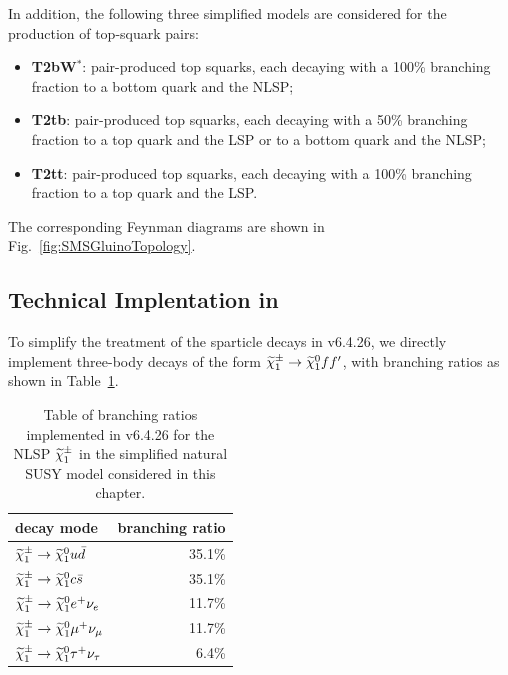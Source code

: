 In addition, the following three simplified models are considered for
the production of top-squark pairs:
\begin{itemize}
\item \textbf{ T2bW$^{\ast}$}: pair-produced top squarks, each decaying
  with a 100\% branching fraction to a bottom quark and the NLSP;
\item \textbf{ T2tb}: pair-produced top squarks, each decaying with a 50\%
  branching fraction to a top quark and the LSP or to a bottom quark and
  the NLSP;
\item \textbf{ T2tt}: pair-produced top squarks, each decaying with a
  100\% branching fraction to a top quark and the LSP.
\end{itemize}
The corresponding Feynman diagrams are shown in
Fig.~\ref{fig:SMSGluinoTopology}.

\subsection{Technical Implentation in \PYTHIA}
To simplify the treatment of the sparticle decays in \PYTHIA v6.4.26, we directly implement three-body decays of
the form $\widetilde{\chi}^{\pm}_1 \to \widetilde{\chi}^{0}_1 f f^{\prime}$, with branching ratios
as shown in Table~\ref{tab:nlspbr}.
\begin{table}
\centering
\begin{tabular}{l|r}
decay mode & branching ratio \\\hline
$\widetilde{\chi}^{\pm}_1 \to \widetilde{\chi}^{0}_1 u \bar d$ &  35.1\%\\
$\widetilde{\chi}^{\pm}_1 \to \widetilde{\chi}^{0}_1 c \bar s$ &  35.1\%\\
$\widetilde{\chi}^{\pm}_1 \to \widetilde{\chi}^{0}_1 e^+ \nu_e$ &  11.7\%\\
$\widetilde{\chi}^{\pm}_1 \to \widetilde{\chi}^{0}_1 \mu^+ \nu_{\mu}$ &  11.7\%\\
$\widetilde{\chi}^{\pm}_1 \to \widetilde{\chi}^{0}_1 \tau^+ \nu_{\tau}$ &  6.4\%
\end{tabular}
\caption{\label{tab:nlspbr}Table of branching ratios implemented in
  \PYTHIA v6.4.26 for the NLSP
  $\widetilde{\chi}^{\pm}_1$ in the simplified natural SUSY model considered in this chapter.}
\end{table}